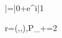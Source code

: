 |\psi\rangle=\cos\frac{}|0\rangle+e^{i\phi}\sin\frac{}|1\rangle

\mathbf r=(\sin\theta\cos\phi,\sin\theta\sin\phi,\cos\theta),\qquad P_+=2
